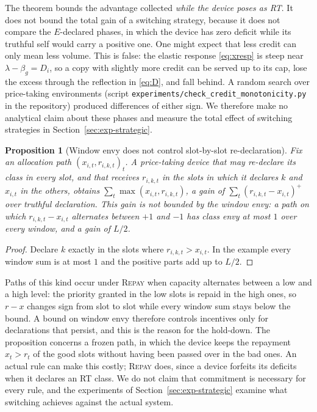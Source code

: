 \documentclass[preprint,11pt]{elsarticle}
\newtheorem{proposition}{Proposition}
\theoremstyle{definition}
\theoremstyle{remark}
\newcommand{\repay}{\textsc{Repay}}
\begin{document}
The theorem bounds the advantage collected \emph{while the device poses as RT}.
It does not bound the total gain of a switching strategy, because it does not compare the $E$-declared phases, in which the device has zero deficit while its truthful self would carry a positive one.
One might expect that less credit can only mean less volume.
This is false: the elastic response \eqref{eq:xresp} is steep near $\lambda-\beta_g=D_i$, so a copy with slightly more credit can be served up to its cap, lose the excess through the reflection in \eqref{eq:D}, and fall behind.
A random search over price-taking environments (script \texttt{experiments/check\_credit\_monotonicity.py} in the repository) produced differences of either sign.
We therefore make no analytical claim about these phases and measure the total effect of switching strategies in Section~\ref{sec:exp-strategic}.

\begin{proposition}[Window envy does not control slot-by-slot re-declaration]\label{prop:commit}
Fix an allocation path $(x_{i,t},r_{i,k,t})_t$.
A price-taking device that may re-declare its class in every slot, and that receives $r_{i,k,t}$ in the slots in which it declares $k$ and $x_{i,t}$ in the others, obtains $\sum_t\max(x_{i,t},r_{i,k,t})$, a gain of $\sum_t(r_{i,k,t}-x_{i,t})^{+}$ over truthful declaration.
This gain is not bounded by the window envy: a path on which $r_{i,k,t}-x_{i,t}$ alternates between $+1$ and $-1$ has class envy at most $1$ over every window, and a gain of $L/2$.
\end{proposition}
\begin{proof}
Declare $k$ exactly in the slots where $r_{i,k,t}>x_{i,t}$. In the example every window sum is at most $1$ and the positive parts add up to $L/2$.
\end{proof}

Paths of this kind occur under \repay{} when capacity alternates between a low and a high level: the priority granted in the low slots is repaid in the high ones, so $r-x$ changes sign from slot to slot while every window sum stays below the bound.
A bound on window envy therefore controls incentives only for declarations that persist, and this is the reason for the hold-down.
The proposition concerns a frozen path, in which the device keeps the repayment $x_t>r_t$ of the good slots without having been passed over in the bad ones.
An actual rule can make this costly; \repay{} does, since a device forfeits its deficits when it declares an RT class.
We do not claim that commitment is necessary for every rule, and the experiments of Section~\ref{sec:exp-strategic} examine what switching achieves against the actual system.
\end{document}
